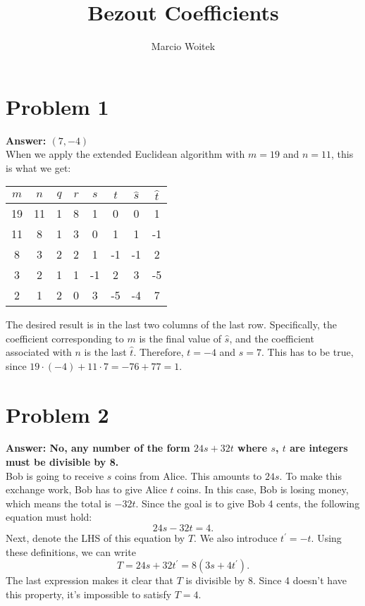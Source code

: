 \documentclass[11pt]{article}
\author{Marcio Woitek}
\date{}
\title{Bezout Coefficients}
\begin{document}
\maketitle
\thispagestyle{empty}
\pagestyle{empty}

\section*{Problem 1}
\label{sec:org425f046}
\textbf{Answer: \((7,-4)\)}\\[0pt]

When we apply the extended Euclidean algorithm with \(m=19\) and \(n=11\), this is
what we get:
\begin{center}
\begin{tabular}{|c|c|c|c|c|c|c|c|}
\hline
\(m\) & \(n\) & \(q\) & \(r\) & \(s\) & \(t\) & \(\hat{s}\) & \(\hat{t}\)\\[0pt]
\hline
19 & 11 & 1 & 8 & 1 & 0 & 0 & 1\\[0pt]
11 & 8 & 1 & 3 & 0 & 1 & 1 & -1\\[0pt]
8 & 3 & 2 & 2 & 1 & -1 & -1 & 2\\[0pt]
3 & 2 & 1 & 1 & -1 & 2 & 3 & -5\\[0pt]
2 & 1 & 2 & 0 & 3 & -5 & -4 & 7\\[0pt]
\hline
\end{tabular}
\end{center}
The desired result is in the last two columns of the last row. Specifically, the
coefficient corresponding to \(m\) is the final value of \(\hat{s}\), and the
coefficient associated with \(n\) is the last \(\hat{t}\). Therefore, \(t=-4\) and
\(s=7\). This has to be true, since \(19\cdot(-4)+11\cdot 7=-76+77=1\).

\section*{Problem 2}
\label{sec:org059245a}
\textbf{Answer: No, any number of the form \(24s+32t\) where \(s\), \(t\) are integers must
be divisible by 8.}\\[0pt]

Bob is going to receive \(s\) coins from Alice. This amounts to \(24s\). To make
this exchange work, Bob has to give Alice \(t\) coins. In this case, Bob is losing
money, which means the total is \(-32t\). Since the goal is to give Bob 4 cents,
the following equation must hold:
\begin{equation}
24s-32t=4.
\end{equation}
Next, denote the LHS of this equation by \(T\). We also introduce \(t^{\prime}=-t\).
Using these definitions, we can write
\begin{equation}
T=24s+32t^{\prime}=8(3s+4t^{\prime}).
\end{equation}
The last expression makes it clear that \(T\) is divisible by 8. Since 4 doesn't
have this property, it's impossible to satisfy \(T=4\).
\end{document}

